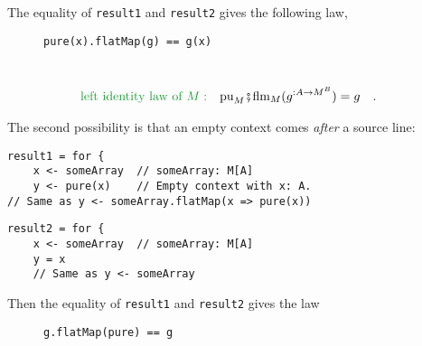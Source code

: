 \noindent \vspace{0.1\baselineskip}
The equality of \lstinline!result1! and \lstinline!result2! gives
the following law,

\begin{wrapfigure}{l}{0.3\columnwidth}%
\vspace{-0.9\baselineskip}
\begin{lstlisting}
pure(x).flatMap(g) == g(x)
\end{lstlisting}
\vspace{-0.6\baselineskip}
\end{wrapfigure}%

~\vspace{-1.4\baselineskip}
\begin{align}
{\color{greenunder}\text{left identity law of }M:}\quad & \text{pu}_{M}\bef\text{flm}_{M}(g^{:A\rightarrow M^{B}})=g\quad.\label{eq:monad-left-identity-law-for-flatMap}
\end{align}
\vspace{-1.2\baselineskip}

The second possibility is that an empty context comes \emph{after}
a source line:

\noindent \texttt{\textcolor{blue}{\footnotesize{}}}%
\begin{minipage}[c]{0.475\columnwidth}%
\texttt{\textcolor{blue}{\footnotesize{}}}
\begin{lstlisting}
result1 = for {
    x <- someArray  // someArray: M[A]
    y <- pure(x)    // Empty context with x: A.
// Same as y <- someArray.flatMap(x => pure(x))
\end{lstlisting}
%
\end{minipage}\texttt{\textcolor{blue}{\footnotesize{}\hspace*{\fill}}}%
\begin{minipage}[c]{0.475\columnwidth}%
\texttt{\textcolor{blue}{\footnotesize{}}}
\begin{lstlisting}
result2 = for {
    x <- someArray  // someArray: M[A]
    y = x
    // Same as y <- someArray
\end{lstlisting}
%
\end{minipage}{\footnotesize\par}

\noindent \vspace{0.1\baselineskip}
Then the equality of \lstinline!result1! and \lstinline!result2!
gives the law

\begin{wrapfigure}{l}{0.3\columnwidth}%
\vspace{-0.85\baselineskip}
\begin{lstlisting}
g.flatMap(pure) == g
\end{lstlisting}
\vspace{-0.6\baselineskip}
\end{wrapfigure}%

